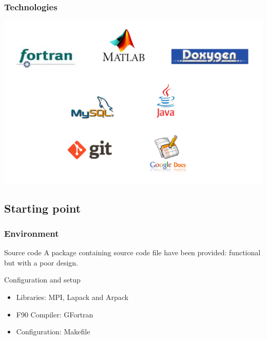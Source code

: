 \documentclass[10p]{beamer}
\begin{document}
\begin{frame}
\frametitle{Technologies}
\includegraphics[width=\textwidth]{Image/logos.png}
\end{frame}
\subsection{Starting point}
\begin{frame}
\frametitle{Environment}
\begin{block}{Source code}
A package containing source code file have been provided: functional but with a poor design.
\end{block}
\begin{block}{Configuration and setup}
\begin{itemize}
\item Libraries: MPI, Lapack and Arpack
\item F90 Compiler: GFortran
\item Configuration: Makefile
\end{itemize}
\end{block}
\end{frame}
\end{document}
